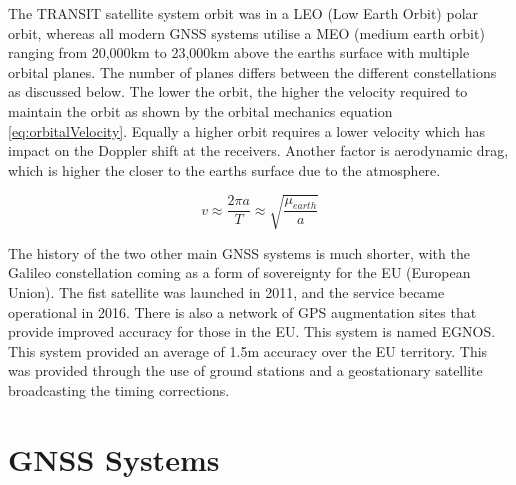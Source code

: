 The TRANSIT satellite system orbit was in a LEO (Low Earth Orbit) polar orbit, whereas all modern GNSS systems utilise a MEO (medium earth orbit) ranging from 20,000km to
23,000km above the earths surface with multiple orbital planes. The number of planes differs between the different constellations as discussed below. The lower the orbit,
the higher the velocity required to maintain the orbit as shown by the orbital mechanics equation \ref{eq:orbitalVelocity}. Equally a higher orbit requires a lower
velocity which has impact on the Doppler shift at the receivers. Another factor is aerodynamic drag, which is higher the closer to the earths surface due to the
atmosphere.

\begin{equation} \label{eq:orbitalVelocity}
    v \approx \frac{2\pi a}{T} \approx \sqrt{\frac{\mu_{earth}}{a}}
\end{equation} 

The history of the two other main GNSS systems is much shorter, with the Galileo constellation coming as a form of sovereignty for the EU (European Union). The fist satellite
was launched in 2011, and the service became operational in 2016. There is also a network of GPS augmentation sites that provide improved accuracy for those in the EU.
This system is named EGNOS. This system provided an average of 1.5m accuracy over the EU territory. This was provided through the use of ground stations and a
geostationary satellite broadcasting the timing corrections. 


\section{GNSS Systems} \label{sec:GNSS}
